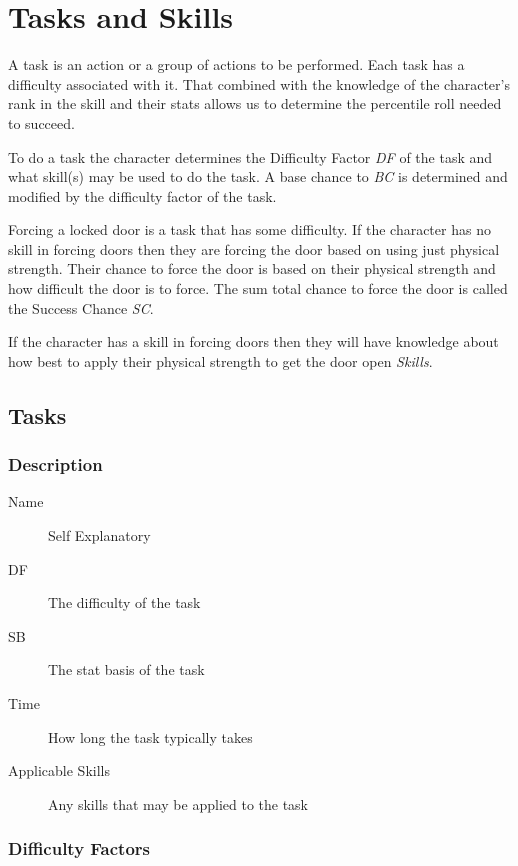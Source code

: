 \chapter{Tasks and Skills}

A task is an action or a group of actions to be performed. Each task has a 
difficulty associated with it. That combined with the knowledge of the character's 
rank in the skill and their stats allows us to determine the percentile roll needed 
to succeed.

To do a task the character determines the Difficulty Factor {\em DF} of the 
task and what skill(s) may be used to do the task. A base chance to 
{\em BC} is determined and modified by the difficulty factor 
of the task. 

Forcing a locked door is a task that has some difficulty. If the 
character has no skill in forcing doors then they are forcing the 
door based on using just physical strength. Their chance to force the 
door is based on their physical strength and how difficult the door 
is to force. The sum total chance to force the door is called the Success Chance {\em SC}.

If the character has a skill in forcing doors then they will have 
knowledge about how best to apply their physical strength to get the 
door open {\em Skills}. 

\section{Tasks}

\subsection{Description}

\begin{description}
	\item[Name] 
	Self Explanatory
	\item[DF] The difficulty of the task
	\item[SB] The stat basis of the task
	\item[Time]
    How long the task typically takes
    \item[Applicable Skills]
    Any skills that may be applied to the task
\end{description}

\subsection{Difficulty Factors}

